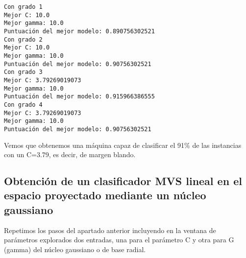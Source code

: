 \documentclass[11pt]{article}
\begin{document}
    \begin{Verbatim}[commandchars=\\\{\}]
Con grado 1
Mejor C: 10.0
Mejor gamma: 10.0
Puntuación del mejor modelo: 0.890756302521
Con grado 2
Mejor C: 10.0
Mejor gamma: 10.0
Puntuación del mejor modelo: 0.90756302521
Con grado 3
Mejor C: 3.79269019073
Mejor gamma: 10.0
Puntuación del mejor modelo: 0.915966386555
Con grado 4
Mejor C: 3.79269019073
Mejor gamma: 10.0
Puntuación del mejor modelo: 0.90756302521

    \end{Verbatim}

    Vemos que obtenemos una máquina capaz de clasificar el 91\% de las
instancias con un C=3.79, es decir, de margen blando.

\subsection{Obtención de un clasificador MVS lineal en el espacio
proyectado mediante un núcleo
gaussiano}\label{obtenciuxf3n-de-un-clasificador-mvs-lineal-en-el-espacio-proyectado-mediante-un-nuxfacleo-gaussiano}

Repetimos los pasos del apartado anterior incluyendo en la ventana de
parámetros explorados dos entradas, una para el parámetro C y otra para
G (gamma) del núcleo gaussiano o de base radial.

\hspace{0.5cm}
\end{document}

